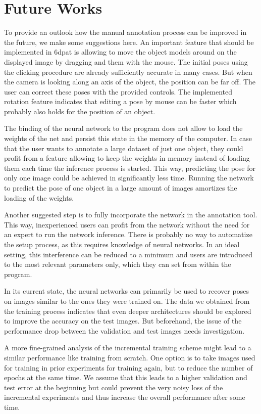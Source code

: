 \chapter{Future Works} \label{chapter:future_work}

To provide an outlook how the manual annotation process can be improved in the future, we make some suggestions here. An important feature that should be implemented in \ac{6dpat} is allowing to move the object models around on the displayed image by dragging and them with the mouse. The initial poses using the clicking procedure are already sufficiently accurate in many cases. But when the camera is looking along an axis of the object, the position can be far off. The user can correct these poses with the provided controls. The implemented rotation feature indicates that editing a pose by mouse can be faster which probably also holds for the position of an object.

The binding of the neural network to the program does not allow to load the weights of the net and persist this state in the memory of the computer. In case that the user wants to annotate a large dataset of just one object, they could profit from a feature allowing to keep the weights in memory instead of loading them each time the inference process is started. This way, predicting the pose for only one image could be achieved in significantly less time. Running the network to predict the pose of one object in a large amount of images amortizes the loading of the weights.

Another suggested step is to fully incorporate the network in the annotation tool. This way, inexperienced users can profit from the network without the need for an expert to run the network inference. There is probably no way to automatize the setup process, as this requires knowledge of neural networks. In an ideal setting, this interference can be reduced to a minimum and users are introduced to the most relevant parameters only, which they can set from within the program.

In its current state, the neural networks can primarily be used to recover poses on images similar to the ones they were trained on. The data we obtained from the training process indicates that even deeper architectures should be explored to improve the accuracy on the test images. But beforehand, the issue of the performance drop between the validation and test images needs investigation. 

A more fine-grained analysis of the incremental training scheme might lead to a similar performance like training from scratch. One option is to take images used for training in prior experiments for training again, but to reduce the number of epochs at the same time. We assume that this leads to a higher validation and test error at the beginning but could prevent the very noisy loss of the incremental experiments and thus increase the overall performance after some time.

